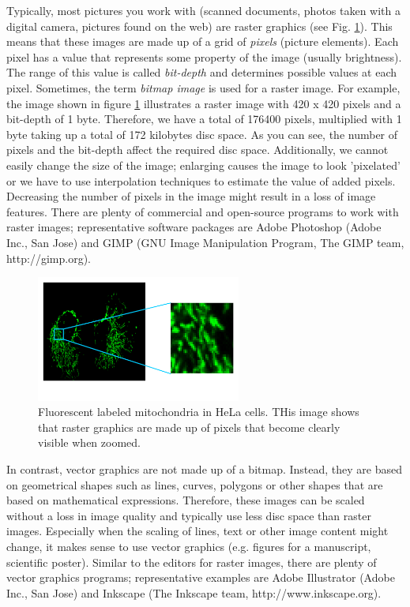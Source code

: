 Typically, most pictures you work with (scanned documents, photos taken with a digital camera, pictures found on the web) are raster graphics (see Fig. \ref{fig:bitmap-graphics}). This means that these images are made up of a grid of \emph{pixels} (picture elements). Each pixel has a value that represents some property of the image (usually brightness). The range of this value is called \emph{bit-depth} and determines possible values at each pixel. Sometimes, the term \emph{bitmap image} is used for a raster image. For example, the image shown in figure \ref{fig:bitmap-graphics} illustrates a raster image with 420 x 420 pixels and a bit-depth of 1 byte. Therefore, we have a total of 176400 pixels, multiplied with 1 byte taking up a total of 172 kilobytes disc space. As you can see, the number of pixels and the bit-depth affect the required disc space. Additionally, we cannot easily change the size of the image; enlarging causes the image to look 'pixelated' or we have to use interpolation techniques to estimate the value of added pixels. Decreasing the number of pixels in the image might result in a loss of image features. There are plenty of commercial and open-source programs to work with raster images; representative software packages are Adobe Photoshop (Adobe Inc., San Jose) and GIMP (GNU Image Manipulation Program, The GIMP team, http://gimp.org).

\begin{figure}[!ht]
	\centering
		\includegraphics[width=0.60\textwidth]{mod1/figures/bitmap-graphics.png}
	\caption{Fluorescent labeled mitochondria in HeLa cells. THis image shows that raster graphics are made up of pixels that become clearly visible when zoomed.}
	\label{fig:bitmap-graphics}
\end{figure}


In contrast, vector graphics are not made up of a bitmap. Instead, they are based on geometrical shapes such as lines, curves, polygons or other shapes that are based on mathematical expressions. Therefore, these images can be scaled without a loss in image quality and typically use less disc space than raster images. Especially when the scaling of lines, text or other image content might change, it makes sense to use vector graphics (e.g. figures for a manuscript, scientific poster). Similar to the editors for raster images, there are plenty of vector graphics programs; representative examples are Adobe Illustrator (Adobe Inc., San Jose) and Inkscape (The Inkscape team, http://www.inkscape.org).

